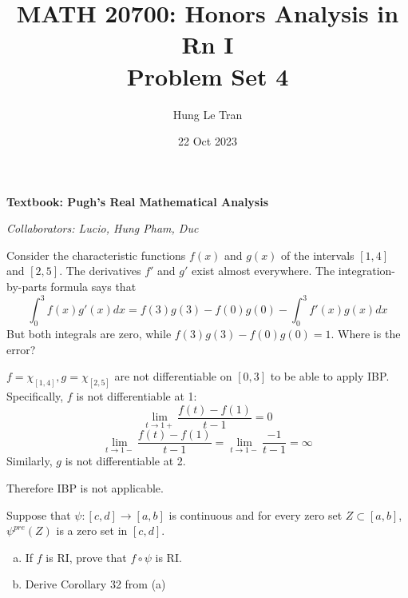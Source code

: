 \documentclass[a4paper, 12pt]{article}
\title{MATH 20700: Honors Analysis in Rn I \\ \large Problem Set 4}
\date{22 Oct 2023}
\author{Hung Le Tran}
\begin{document}
\maketitle
\setcounter{section}{4}
\textbf{Textbook: Pugh's Real Mathematical Analysis}

\textit{Collaborators: Lucio, Hung Pham, Duc}
\begin{problem} 
Consider the characteristic functions $f(x)$ and $g(x)$ of the intervals $[1, 4]$ and $[2, 5]$. The derivatives $f'$ and $g'$ exist almost everywhere. The integration-by-parts formula says that \[
    \int_0^3 f(x) g'(x) dx = f(3)g(3) - f(0)g(0) - \int_0^3f'(x) g(x) dx
\]
But both integrals are zero, while $f(3) g(3) - f(0)g(0) = 1$. Where is the error?
\end{problem}
\begin{solution}
    $f = \chi_{[1, 4]}, g = \chi_{[2, 5]}$ are not differentiable on $[0, 3]$ to be able to apply IBP. Specifically, $f$ is not differentiable at 1:
    \[
        \lim_{t \to 1+} \frac{f(t) - f(1)}{t - 1} = 0
    \]
    \[
        \lim_{t \to 1-} \frac{f(t) - f(1)}{t - 1} = \lim_{t \to 1-}\frac{-1}{t - 1} = \infty
    \]
    Similarly, $g$ is not differentiable at 2.

    Therefore IBP is not applicable.
\end{solution}
\begin{problem} 
Suppose that $\psi: [c, d] \to [a, b]$ is continuous and for every zero set $Z \subset [a, b]$, $\psi^{pre}(Z)$ is a zero set in $[c, d]$.
\begin{enumerate} [(a)]
    \item If $f$ is RI, prove that $f \circ \psi$ is RI.
    \item Derive Corollary 32 from (a)
\end{enumerate}
\end{problem}
\end{document}

